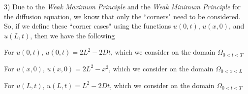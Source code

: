 \documentclass[executivepaper]{article}
\begin{document}
\begin{flushleft}

3) Due to the \textit{Weak Maximum Principle} and the \textit{Weak Minimum Principle} for the diffusion equation, we know that only the ``corners" need to be considered. So, if we define these ``corner cases" using the functions $u(0,t)$, $u(x,0)$, and $u(L,t)$, then we have the following

\begin{center}

For $u(0,t)$, $u(0,t)=2L^2-2Dt$, which we consider on the domain $\Omega_{0 < t < T}$

\vspace{3mm}

For $u(x,0)$, $u(x,0)=2L^2-x^2$, which we consider on the domain $\Omega_{0 < x < L}$

\vspace{3mm}

For $u(L,t)$, $u(L,t)=L^2-2Dt$, which we consider on the domain $\Omega_{0 < t < T}$

\end{center}

\end{flushleft}
\end{document}
